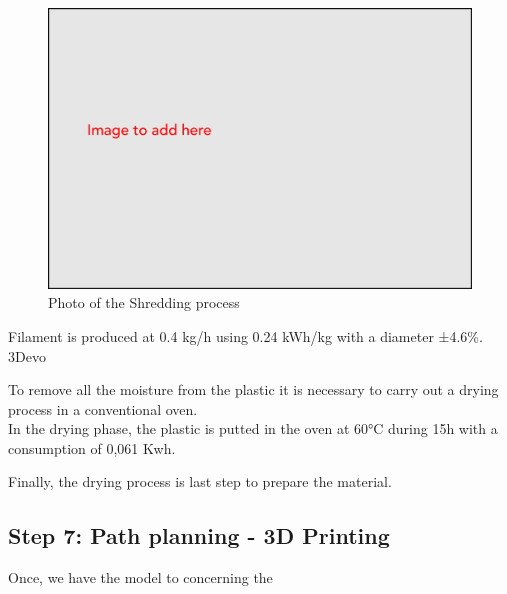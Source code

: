 \documentclass[
  11pt,
]{article}
\begin{document}
\begin{figure}[H]

{\centering \includegraphics[width=5.20833in,height=\textheight]{figures/Image-to-add.png}

}

\caption{Photo of the Shredding process}

\end{figure}

Filament is produced at 0.4 kg/h using 0.24 kWh/kg with a diameter
±4.6\%. 3Devo

To remove all the moisture from the plastic it is necessary to carry out
a drying process in a conventional oven.\\
In the drying phase, the plastic is putted in the oven at 60°C during
15h with a consumption of 0,061 Kwh.

Finally, the drying process is last step to prepare the material.

\hypertarget{step-7-path-planning---3d-printing}{%
\subsection{Step 7: Path planning - 3D
Printing}\label{step-7-path-planning---3d-printing}}

Once, we have the model to concerning the
\end{document}
